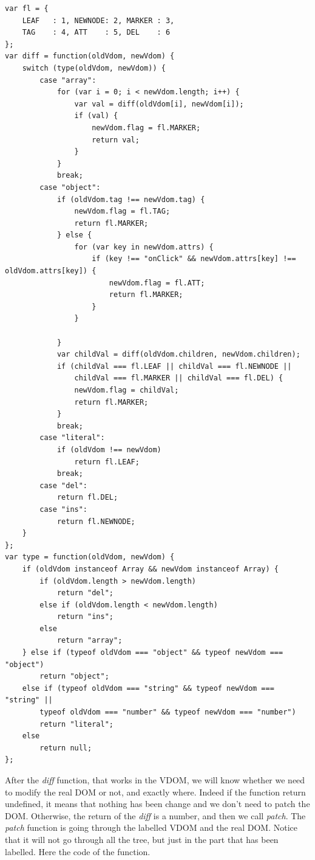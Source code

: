 \documentclass[10pt]{article}
\begin{document}
\begin{lstlisting}[caption=\textit{diff} function]
var fl = {
    LEAF   : 1, NEWNODE: 2, MARKER : 3,
    TAG    : 4, ATT    : 5, DEL    : 6
};
var diff = function(oldVdom, newVdom) {
    switch (type(oldVdom, newVdom)) {
        case "array":
            for (var i = 0; i < newVdom.length; i++) {
                var val = diff(oldVdom[i], newVdom[i]);
                if (val) {
                    newVdom.flag = fl.MARKER;
                    return val;
                }
            }
            break;
        case "object":
            if (oldVdom.tag !== newVdom.tag) {
                newVdom.flag = fl.TAG;
                return fl.MARKER;
            } else {
                for (var key in newVdom.attrs) {
                    if (key !== "onClick" && newVdom.attrs[key] !== oldVdom.attrs[key]) {
                        newVdom.flag = fl.ATT;
                        return fl.MARKER;
                    }
                }

            }
            var childVal = diff(oldVdom.children, newVdom.children);
            if (childVal === fl.LEAF || childVal === fl.NEWNODE ||
                childVal === fl.MARKER || childVal === fl.DEL) {
                newVdom.flag = childVal;
                return fl.MARKER;
            }
            break;
        case "literal":
            if (oldVdom !== newVdom)
                return fl.LEAF;
            break;
        case "del":
            return fl.DEL;
        case "ins":
            return fl.NEWNODE;
    }
};
var type = function(oldVdom, newVdom) {
    if (oldVdom instanceof Array && newVdom instanceof Array) {
        if (oldVdom.length > newVdom.length)
            return "del";
        else if (oldVdom.length < newVdom.length) 
            return "ins";
        else
            return "array";
    } else if (typeof oldVdom === "object" && typeof newVdom === "object")
        return "object";
    else if (typeof oldVdom === "string" && typeof newVdom === "string" ||
        typeof oldVdom === "number" && typeof newVdom === "number")
        return "literal";
    else
        return null;
};
\end{lstlisting}
After the \textit{diff} function, that works in the VDOM, we will know whether we need to modify the real DOM or not, and exactly where. Indeed if the function return undefined, it means that nothing has been change and we don't need to patch the DOM. Otherwise, the return of the \textit{diff} is a number, and then we call \textit{patch}. The \textit{patch} function is going through the labelled VDOM and the real DOM. Notice that it will not go through all the tree, but just in the part that has been labelled. Here the code of the function.   
\end{document}
